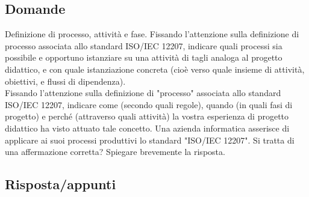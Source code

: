 \subsection*{Domande}

Definizione di processo, attività e fase.
Fissando l'attenzione sulla definizione di processo associata allo standard ISO/IEC 12207, indicare quali processi sia possibile e opportuno istanziare su una attività di tagli analoga al progetto didattico, e con quale istanziazione concreta (cioè verso quale insieme di attività, obiettivi, e flussi di dipendenza).\\

Fissando l'attenzione sulla definizione di "processo" associata allo standard ISO/IEC 12207, indicare come (secondo quali regole), quando (in quali fasi di progetto) e perché (attraverso quali attività) la vostra esperienza di progetto didattico ha visto attuato tale concetto. 
Una azienda informatica asserisce di applicare ai suoi processi produttivi lo standard "ISO/IEC 12207". Si tratta di una affermazione corretta? Spiegare brevemente la risposta.\\

\subsection*{Risposta/appunti}

